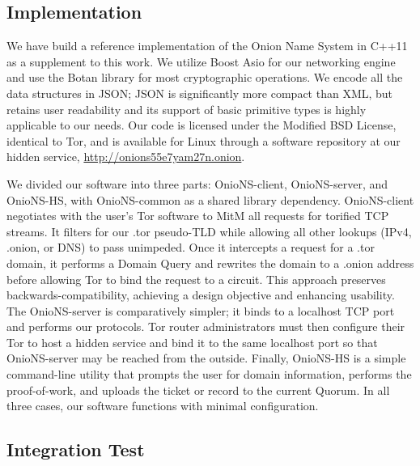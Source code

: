 \documentclass[USenglish,oneside,twocolumn]{article}
\begin{document}
\subsection{Implementation}

We have build a reference implementation of the Onion Name System in C++11 as a supplement to this work. We utilize Boost Asio \cite{AsioLib} for our networking engine and use the Botan \cite{BotanLib} library for most cryptographic operations. We encode all the data structures in JSON; JSON is significantly more compact than XML, but retains user readability and its support of basic primitive types is highly applicable to our needs. Our code is licensed under the Modified BSD License, identical to Tor, and is available for Linux through a software repository at our hidden service, \href{http://onions55e7yam27n.onion}{http://onions55e7yam27n.onion}.

We divided our software into three parts: OnioNS-client, OnioNS-server, and OnioNS-HS, with OnioNS-common as a shared library dependency. OnioNS-client negotiates with the user's Tor software to MitM all requests for torified TCP streams. It filters for our .tor pseudo-TLD while allowing all other lookups (IPv4, .onion, or DNS) to pass unimpeded. Once it intercepts a request for a .tor domain, it performs a Domain Query and rewrites the domain to a .onion address before allowing Tor to bind the request to a circuit. This approach preserves backwards-compatibility, achieving a design objective and enhancing usability. The OnioNS-server is comparatively simpler; it binds to a localhost TCP port and performs our protocols. Tor router administrators must then configure their Tor to host a hidden service and bind it to the same localhost port so that OnioNS-server may be reached from the outside. Finally, OnioNS-HS is a simple command-line utility that prompts the user for domain information, performs the proof-of-work, and uploads the ticket or record to the current Quorum. In all three cases, our software functions with minimal configuration.

\subsection{Integration Test}
\end{document}
